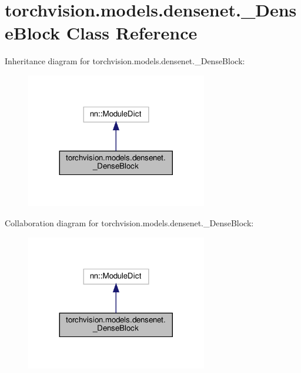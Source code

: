 \hypertarget{classtorchvision_1_1models_1_1densenet_1_1__DenseBlock}{}\section{torchvision.\+models.\+densenet.\+\_\+\+Dense\+Block Class Reference}
\label{classtorchvision_1_1models_1_1densenet_1_1__DenseBlock}


Inheritance diagram for torchvision.\+models.\+densenet.\+\_\+\+Dense\+Block\+:
\nopagebreak
\begin{figure}[H]
\begin{center}
\leavevmode
\includegraphics[width=224pt]{classtorchvision_1_1models_1_1densenet_1_1__DenseBlock__inherit__graph}
\end{center}
\end{figure}


Collaboration diagram for torchvision.\+models.\+densenet.\+\_\+\+Dense\+Block\+:
\nopagebreak
\begin{figure}[H]
\begin{center}
\leavevmode
\includegraphics[width=224pt]{classtorchvision_1_1models_1_1densenet_1_1__DenseBlock__coll__graph}
\end{center}
\end{figure}
